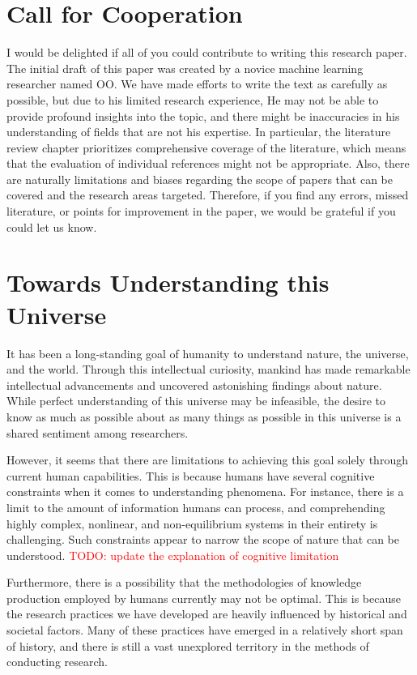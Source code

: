 \documentclass{book}
\begin{document}
\section{Call for Cooperation}
I would be delighted if all of you could contribute to writing this research paper. The initial draft of this paper was created by a novice machine learning researcher named OO. We have made efforts to write the text as carefully as possible, but due to his limited research experience, He may not be able to provide profound insights into the topic, and there might be inaccuracies in his understanding of fields that are not his expertise. In particular, the literature review chapter prioritizes comprehensive coverage of the literature, which means that the evaluation of individual references might not be appropriate. Also, there are naturally limitations and biases regarding the scope of papers that can be covered and the research areas targeted. Therefore, if you find any errors, missed literature, or points for improvement in the paper, we would be grateful if you could let us know.



\section{Towards Understanding this Universe}
It has been a long-standing goal of humanity to understand nature, the universe, and the world. Through this intellectual curiosity, mankind has made remarkable intellectual advancements and uncovered astonishing findings about nature. While perfect understanding of this universe may be infeasible, the desire to know as much as possible about as many things as possible in this universe is a shared sentiment among researchers.

However, it seems that there are limitations to achieving this goal solely through current human capabilities. This is because humans have several cognitive constraints when it comes to understanding phenomena. For instance, there is a limit to the amount of information humans can process, and comprehending highly complex, nonlinear, and non-equilibrium systems in their entirety is challenging. Such constraints appear to narrow the scope of nature that can be understood. \textcolor{red}{TODO: update the explanation of cognitive limitation}

Furthermore, there is a possibility that the methodologies of knowledge production employed by humans currently may not be optimal. This is because the research practices we have developed are heavily influenced by historical and societal factors. Many of these practices have emerged in a relatively short span of history, and there is still a vast unexplored territory in the methods of conducting research.
\end{document}
